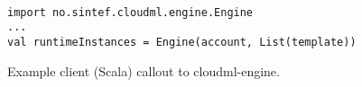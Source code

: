 \begin{figure}[tb]
  \begin{center}
    \begin{verbatim}

import no.sintef.cloudml.engine.Engine
...
val runtimeInstances = Engine(account, List(template))
    \end{verbatim}
  \end{center}
  \caption{Example client (Scala) callout to cloudml-engine.}
  \label{fig:cloudml-engine-usage}
\end{figure}

